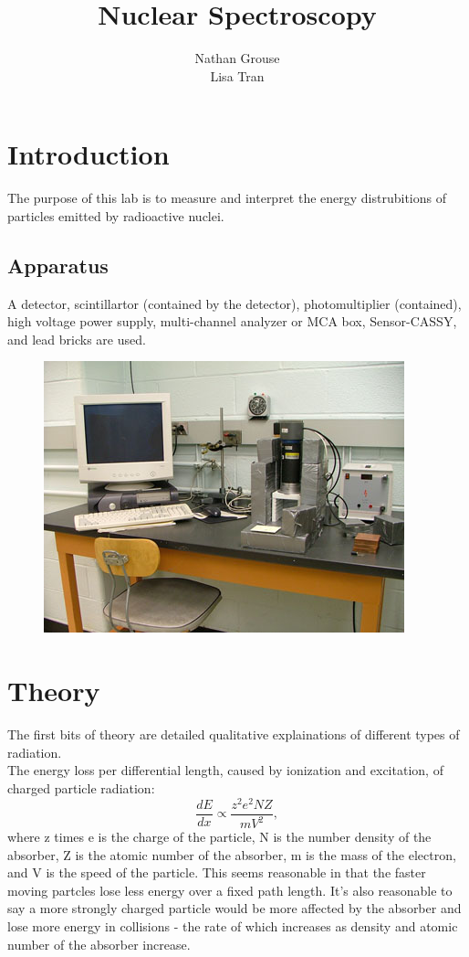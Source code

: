 \documentclass[12pt]{article}
\title{Nuclear Spectroscopy}
\author{Nathan Grouse\\Lisa Tran}
\begin{document}
\maketitle

\section{Introduction}
\indent \indent The purpose of this lab is to measure and interpret the energy distrubitions of particles emitted by radioactive nuclei.

\subsection{Apparatus}
\indent \indent A detector, scintillartor (contained by the detector), photomultiplier (contained), high voltage power supply, multi-channel analyzer or MCA box, Sensor-CASSY, and lead bricks are used.

\begin{figure}[H]
\centering
\hspace{-0.0in}\includegraphics[scale=0.90]{apparatus.png}
\end{figure}

\section{Theory}
\indent \indent The first bits of theory are detailed qualitative explainations of different types of radiation. \\
\indent The energy loss per differential length, caused by ionization and excitation, of charged particle radiation:
\[\frac{dE}{dx} \propto \frac{z^2e^2NZ}{mV^2} ,\]
\indent where z times e is the charge of the particle, N is the number density of the absorber, Z is the atomic number of the absorber, m is the mass of the electron, and V is the speed of the particle. This seems reasonable in that the faster moving partcles lose less energy over a fixed path length. It's also reasonable to say a more strongly charged particle would be more affected by the absorber and lose more energy in collisions - the rate of which increases as density and atomic number of the absorber increase. \\
\end{document}
